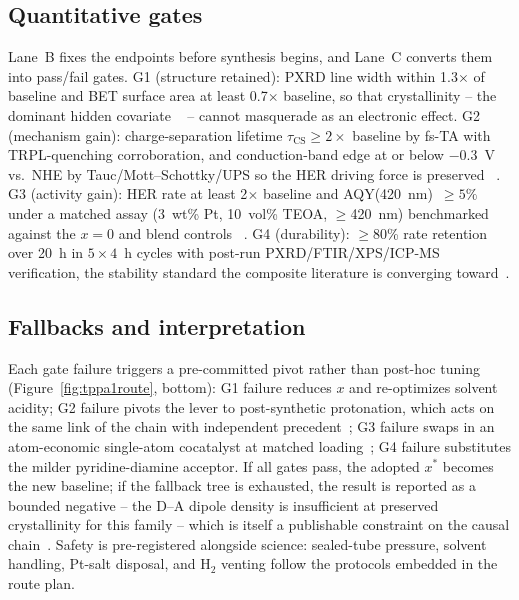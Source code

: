 \subsection{Quantitative gates}

Lane~B fixes the endpoints before synthesis begins, and Lane~C converts
them into pass/fail gates. G1 (structure retained): PXRD line width within
1.3$\times$ of baseline and BET surface area at least 0.7$\times$ baseline,
so that crystallinity -- the dominant hidden covariate
~\cite{xiao2024molecular,jia2025copper} -- cannot masquerade as an
electronic effect. G2 (mechanism gain): charge-separation lifetime
$\tau_{\mathrm{CS}} \geq 2\times$ baseline by fs-TA with TRPL-quenching
corroboration, and conduction-band edge at or below $-0.3$~V vs.\ NHE by
Tauc/Mott--Schottky/UPS so the HER driving force is preserved
~\cite{qian2023computation,chu2024controlled,choi2024understanding}.
G3 (activity gain): HER rate at least 2$\times$ baseline and
AQY(420~nm)~$\geq 5\%$ under a matched assay (3~wt\% Pt, 10~vol\% TEOA,
$\geq$420~nm) benchmarked against the $x=0$ and blend controls
~\cite{mo2020alkene,wang2026bandgap}. G4 (durability): $\geq$80\% rate
retention over 20~h in $5\times4$~h cycles with post-run
PXRD/FTIR/XPS/ICP-MS verification, the stability standard the composite
literature is converging toward~\cite{he2023integrated,lu2024copper}.

\subsection{Fallbacks and interpretation}

Each gate failure triggers a pre-committed pivot rather than post-hoc
tuning (Figure~\ref{fig:tppa1route}, bottom): G1 failure reduces $x$ and
re-optimizes solvent acidity; G2 failure pivots the lever to post-synthetic
protonation, which acts on the same link of the chain with independent
precedent~\cite{yang2021protonated,he2024double,duan2024protonated};
G3 failure swaps in an atom-economic single-atom cocatalyst at matched
loading~\cite{dong2021platinum,chen2024low}; G4 failure substitutes the
milder pyridine-diamine acceptor. If all gates pass, the adopted $x^*$
becomes the new baseline; if the fallback tree is exhausted, the result is
reported as a bounded negative -- the D--A dipole density is insufficient at
preserved crystallinity for this family -- which is itself a publishable
constraint on the causal chain~\cite{ghosh2020identification}. Safety is
pre-registered alongside science: sealed-tube pressure, solvent handling,
Pt-salt disposal, and H$_2$ venting follow the protocols embedded in the
route plan.
